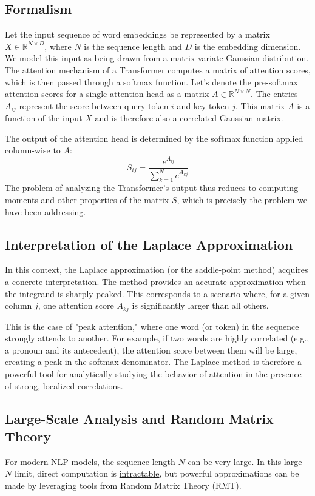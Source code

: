 \documentclass[12pt]{article}
\begin{document}
\subsection{Formalism}
Let the input sequence of word embeddings be represented by a matrix $X \in \mathbb{R}^{N \times D}$, where $N$ is the sequence length and $D$ is the embedding dimension. We model this input as being drawn from a matrix-variate Gaussian distribution. The attention mechanism of a Transformer computes a matrix of attention scores, which is then passed through a softmax function. Let's denote the pre-softmax attention scores for a single attention head as a matrix $A \in \mathbb{R}^{N \times N}$. The entries $A_{ij}$ represent the score between query token $i$ and key token $j$. This matrix $A$ is a function of the input $X$ and is therefore also a correlated Gaussian matrix.

The output of the attention head is determined by the softmax function applied column-wise to $A$:
\[
S_{ij} = \frac{e^{A_{ij}}}{\sum_{k=1}^{N} e^{A_{kj}}}
\]
The problem of analyzing the Transformer's output thus reduces to computing moments and other properties of the matrix $S$, which is precisely the problem we have been addressing.

\subsection{Interpretation of the Laplace Approximation}
In this context, the Laplace approximation (or the saddle-point method) acquires a concrete interpretation. The method provides an accurate approximation when the integrand is sharply peaked. This corresponds to a scenario where, for a given column $j$, one attention score $A_{kj}$ is significantly larger than all others.

This is the case of "peak attention," where one word (or token) in the sequence strongly attends to another. For example, if two words are highly correlated (e.g., a pronoun and its antecedent), the attention score between them will be large, creating a peak in the softmax denominator. The Laplace method is therefore a powerful tool for analytically studying the behavior of attention in the presence of strong, localized correlations.

\subsection{Large-Scale Analysis and Random Matrix Theory}
For modern NLP models, the sequence length $N$ can be very large. In this large-$N$ limit, direct computation is \underline{intractable}, but powerful approximations can be made by leveraging tools from Random Matrix Theory (RMT).
\end{document}
